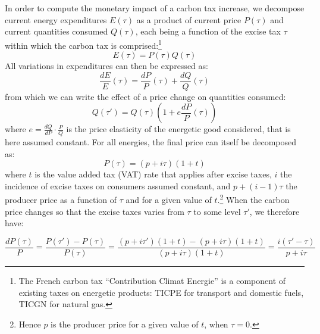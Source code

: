 \documentclass[12pt]{article} %
\begin{document}
\begin{appendices}
In order to compute the monetary impact of a carbon tax increase, we decompose current energy expenditures $E(\tau)$ as a product of current price $P(\tau)$ and current quantities consumed $Q(\tau)$, each being a function of the excise tax $\tau$ within which the carbon tax is comprised:\footnote{The French carbon tax ``Contribution Climat Energie'' is a component of existing taxes on energetic products: TICPE for transport and domestic fuels, TICGN for natural gas.}
$$
E\left( \tau \right) = P\left( \tau \right) Q\left(\tau\right)
$$
\noindent
All variations in expenditures can then be expressed as:
$$
\frac{dE}{E}\left(\tau\right) = \frac{dP}{P}\left(\tau\right) + \frac{dQ}{Q}\left(\tau\right)
$$
\noindent
from which we can write the effect of a price change on quantities consumed:
$$
Q\left(\tau '\right) = Q\left(\tau\right) \left(1 + e\frac{dP}{P}\left(\tau\right)\right)
$$
\noindent
where $e = \frac{dQ}{dP} \cdot \frac{P}{Q}$ is the price elasticity of the energetic good considered, that is here assumed constant. For all energies, the final price can itself be decomposed as:
$$
P\left(\tau\right) = \left(p+i\tau\right)\left(1+t\right)
$$
\noindent
where $t$ is the value added tax (VAT) rate that applies after excise taxes, $i$ the incidence of excise taxes on consumers assumed constant, and $p + \left(i-1\right)\tau$ the producer price as a function of $\tau$ and for a given value of $t$.\footnote{Hence $p$ is the producer price for a given value of $t$, when $\tau = 0$.} When the carbon price changes so that the excise taxes varies from $\tau$ to some level $\tau'$, we therefore have: 

$$
\frac{dP\left(\tau\right)}{P} = \frac{P\left(\tau '\right) - P\left(\tau\right)}{P\left(\tau\right)} = \frac{\left(p + i \tau '\right)\left(1+t\right) -  \left(p + i \tau\right)\left(1+t\right)}{\left(p + i \tau\right)\left(1+t\right)} = \frac{i\left(\tau' - \tau\right)}{p + i \tau}$$


\end{appendices}
\end{document}
